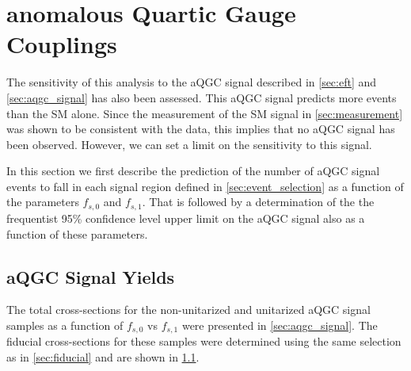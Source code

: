 \section{anomalous Quartic Gauge Couplings}

The sensitivity of this analysis to the aQGC signal described in \sec\ref{sec:eft} and 
\sec\ref{sec:aqgc_signal} has also been assessed.  This aQGC signal predicts
more events than the SM alone. Since the measurement of the SM signal in
\sec\ref{sec:measurement} was shown to be consistent with the data, this implies
that no aQGC signal has been observed. However, we can set a limit on the sensitivity 
to this signal.

In this section we first describe the prediction of the number of aQGC signal events
to fall in each signal region defined in \sec\ref{sec:event_selection} as a function
of the parameters $f_{s,0}$ and $f_{s,1}$. That is followed by 
a determination of the the frequentist 95\% confidence level upper limit on the aQGC
signal also as a function of these parameters. 

\subsection{aQGC Signal Yields}
The total cross-sections for the non-unitarized and unitarized aQGC
signal samples as a function of $f_{s,0}$ vs $f_{s,1}$ 
were presented in \sec\ref{sec:aqgc_signal}.
The fiducial cross-sections for these samples were determined using 
the same selection as in \sec\ref{sec:fiducial} and are shown in 
\fig\ref{}.


